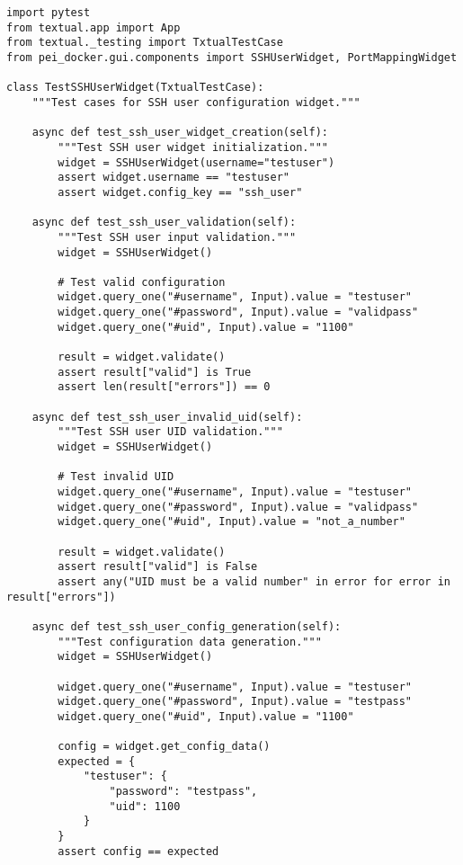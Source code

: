 \documentclass[11pt,a4paper]{article}
\begin{document}
\begin{lstlisting}[caption={Component Testing Framework}]
import pytest
from textual.app import App
from textual._testing import TxtualTestCase
from pei_docker.gui.components import SSHUserWidget, PortMappingWidget

class TestSSHUserWidget(TxtualTestCase):
    """Test cases for SSH user configuration widget."""
    
    async def test_ssh_user_widget_creation(self):
        """Test SSH user widget initialization."""
        widget = SSHUserWidget(username="testuser")
        assert widget.username == "testuser"
        assert widget.config_key == "ssh_user"
        
    async def test_ssh_user_validation(self):
        """Test SSH user input validation."""
        widget = SSHUserWidget()
        
        # Test valid configuration
        widget.query_one("#username", Input).value = "testuser"
        widget.query_one("#password", Input).value = "validpass"
        widget.query_one("#uid", Input).value = "1100"
        
        result = widget.validate()
        assert result["valid"] is True
        assert len(result["errors"]) == 0
        
    async def test_ssh_user_invalid_uid(self):
        """Test SSH user UID validation."""
        widget = SSHUserWidget()
        
        # Test invalid UID
        widget.query_one("#username", Input).value = "testuser"
        widget.query_one("#password", Input).value = "validpass"
        widget.query_one("#uid", Input).value = "not_a_number"
        
        result = widget.validate()
        assert result["valid"] is False
        assert any("UID must be a valid number" in error for error in result["errors"])
        
    async def test_ssh_user_config_generation(self):
        """Test configuration data generation."""
        widget = SSHUserWidget()
        
        widget.query_one("#username", Input).value = "testuser"
        widget.query_one("#password", Input).value = "testpass"
        widget.query_one("#uid", Input).value = "1100"
        
        config = widget.get_config_data()
        expected = {
            "testuser": {
                "password": "testpass",
                "uid": 1100
            }
        }
        assert config == expected


\end{lstlisting}
\end{document}
